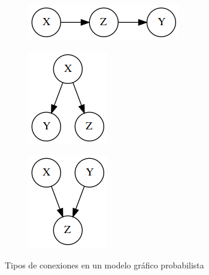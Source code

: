 \begin{figure}[h!]
	\centering		
	\begin{subfigure}{\linewidth}
		\centering
		\includegraphics[width=0.40\linewidth]{./images/Chapter 2/chain.png}
		\label{fig:chain}
	\end{subfigure}
	\begin{subfigure}{0.40\linewidth}
		\centering
		\includegraphics[width=0.5\linewidth]{./images/Chapter 2/fork.png}		
		\label{fig:fork}
	\end{subfigure}
	\begin{subfigure}{0.40\linewidth}
		\centering
		\includegraphics[width=0.5\linewidth]{./images/Chapter 2/collider.png}
		\label{fig:collider}
	\end{subfigure}		
	\caption{Tipos de conexiones en un modelo gráfico probabilista}
	\label{fig:connections}
\end{figure}

